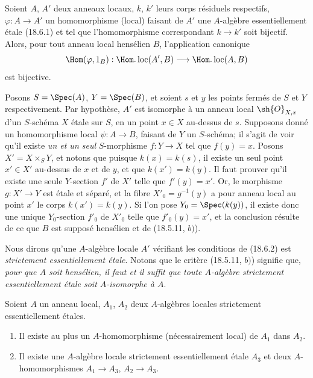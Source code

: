 \begin{lemma}[18.6.2]
\label{IV.18.6.2}
Soient $A$, $A'$ deux anneaux locaux, $k$, $k'$ leurs corps résiduels respectifs, $\varphi:A\to A'$ un homomorphisme (local) faisant de $A'$ une $A$-algèbre essentiellement étale (18.6.1) et tel que l'homomorphisme correspondant $k\to k'$ soit bijectif. Alors, pour tout anneau local hensélien $B$, l'application canonique
\[
  \Hom(\varphi,1_B):\Hom.\operatorname{loc}(A',B)\longrightarrow\Hom.\operatorname{loc}(A,B)
\]
est bijective.
\end{lemma}

Posons $S=\Spec(A)$, $Y=\Spec(B)$, et soient $s$ et $y$ les points fermés de $S$ et $Y$ respectivement. Par hypothèse, $A'$ est isomorphe à un anneau local $\sh{O}_{X,x}$ d'un $S$-schéma $X$ étale sur $S$, en un point $x\in X$ au-dessus de $s$. Supposons donné un homomorphisme local $\psi:A\to B$, faisant de $Y$ un $S$-schéma; il s'agit de voir qu'il existe \emph{un et un seul} $S$-morphisme $f:Y\to X$ tel que $f(y)=x$. Posons $X'=X\times_S Y$, et notons que puisque $k(x)=k(s)$, il existe un seul point $x'\in X'$ au-dessus de $x$ et de $y$, et que $k(x')=k(y)$. Il faut prouver qu'il existe une seule $Y$-section $f'$ de $X'$ telle que $f'(y)=x'$. Or, le morphisme $g:X'\to Y$ est étale et séparé, et la fibre $X'_0=g^{-1}(y)$ a pour anneau local au point $x'$ le corps $k(x')=k(y)$. Si l'on pose $Y_0=\Spec(k(y))$, il existe donc une unique $Y_0$-section $f'_0$ de $X'_0$ telle que $f'_0(y)=x'$, et la conclusion résulte de ce que $B$ est supposé hensélien et de (18.5.11, $b)$).

Nous dirons qu'une $A$-algèbre locale $A'$ vérifiant les conditions de (18.6.2) est \emph{strictement essentiellement étale}. Notons que le critère (18.5.11, $b)$) signifie que, \emph{pour que $A$ soit hensélien, il faut et il suffit que toute $A$-algèbre strictement essentiellement étale soit $A$-isomorphe à $A$}.

\begin{lemma}[18.6.3]
\label{IV.18.6.3}
Soient $A$ un anneau local, $A_1$, $A_2$ deux $A$-algèbres locales strictement essentiellement étales.
\begin{enumerate}
  \item[(i)] Il existe au plus un $A$-homomorphisme (nécessairement local) de $A_1$ dans $A_2$.
  \item[(ii)] Il existe une $A$-algèbre locale strictement essentiellement étale $A_3$ et deux $A$-homomorphismes $A_1\to A_3$, $A_2\to A_3$.
\end{enumerate}
\end{lemma}

